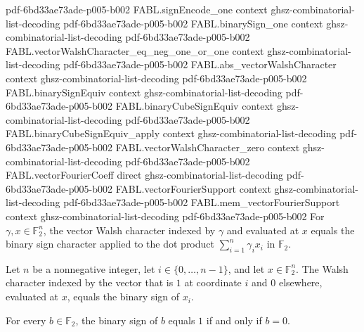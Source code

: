\begin{theorem}
  {pdf-6bd33ae73ade-p005-b002}
\proofstep
  {FABL.signEncode_one}
  {context}
  {ghsz-combinatorial-list-decoding}
  {pdf-6bd33ae73ade-p005-b002}
\proofstep
  {FABL.binarySign_one}
  {context}
  {ghsz-combinatorial-list-decoding}
  {pdf-6bd33ae73ade-p005-b002}
\proofstep
  {FABL.vectorWalshCharacter_eq_neg_one_or_one}
  {context}
  {ghsz-combinatorial-list-decoding}
  {pdf-6bd33ae73ade-p005-b002}
\proofstep
  {FABL.abs_vectorWalshCharacter}
  {context}
  {ghsz-combinatorial-list-decoding}
  {pdf-6bd33ae73ade-p005-b002}
\proofstep
  {FABL.binarySignEquiv}
  {context}
  {ghsz-combinatorial-list-decoding}
  {pdf-6bd33ae73ade-p005-b002}
\proofstep
  {FABL.binaryCubeSignEquiv}
  {context}
  {ghsz-combinatorial-list-decoding}
  {pdf-6bd33ae73ade-p005-b002}
\proofstep
  {FABL.binaryCubeSignEquiv_apply}
  {context}
  {ghsz-combinatorial-list-decoding}
  {pdf-6bd33ae73ade-p005-b002}
\proofstep
  {FABL.vectorWalshCharacter_zero}
  {context}
  {ghsz-combinatorial-list-decoding}
  {pdf-6bd33ae73ade-p005-b002}
\proofstep
  {FABL.vectorFourierCoeff}
  {direct}
  {ghsz-combinatorial-list-decoding}
  {pdf-6bd33ae73ade-p005-b002}
\proofstep
  {FABL.vectorFourierSupport}
  {context}
  {ghsz-combinatorial-list-decoding}
  {pdf-6bd33ae73ade-p005-b002}
\proofstep
  {FABL.mem_vectorFourierSupport}
  {context}
  {ghsz-combinatorial-list-decoding}
  {pdf-6bd33ae73ade-p005-b002}
For $\gamma,x\in\mathbb{F}_2^n$, the vector Walsh character indexed by $\gamma$ and
evaluated at $x$ equals the binary sign character applied to the dot product
$\sum_{i=1}^n\gamma_i x_i$ in $\mathbb{F}_2$.
\end{theorem}

\begin{theorem}
\leanok
{}
Let $n$ be a nonnegative integer, let $i\in\{0,\ldots,n-1\}$, and let $x\in\mathbb
F_2^n$. The Walsh character indexed by the vector that is $1$ at coordinate $i$ and $0$
elsewhere, evaluated at $x$, equals the binary sign of $x_i$.
\end{theorem}

\begin{theorem}
\label{FABL.binarySign_eq_one_iff}
\leanok
{}
For every $b\in\mathbb{F}_2$, the binary sign of $b$ equals $1$ if and only if $b=0$.
\end{theorem}

